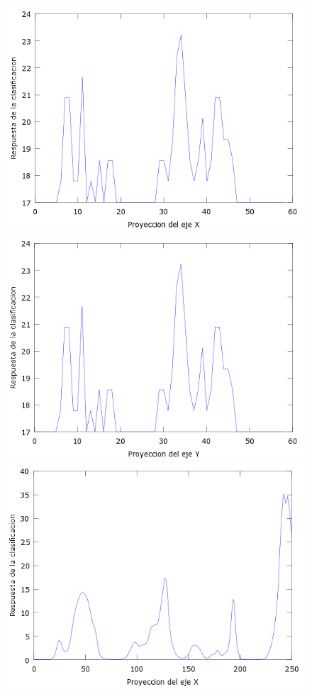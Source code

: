\begin{figure}[H]
  \centering
  \includegraphics[scale=.4]{images/plots/boost4X}
  \includegraphics[scale=.4]{images/plots/boost4Y}
  \includegraphics[scale=.4]{images/plots/svm4X}

\end{figure}
